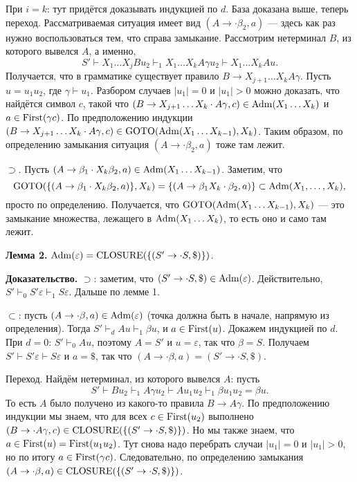 При $i = k$: тут придётся доказывать индукцией по $d$. База доказана выше, теперь переход.
Рассматриваемая ситуация  имеет вид $(A \to \cdot \beta_2, a)$ --- здесь как раз нужно воспользоваться тем, что справа замыкание.
Рассмотрим нетерминал $B$, из которого вывелся $A$, а именно,
\[
    S' \vdash X_1 \dots X_j B u_2 \vdash_1 X_1 \dots X_k A \gamma u_2 \vdash X_1 \dots X_k A u.
\]
Получается, что в грамматике существует правило $B \to X_{j+1} \dots X_k A \gamma$.
Пусть $u = u_1 u_2$, где $\gamma \vdash u_1$.
Разбором случаев $|u_1| = 0$ и $|u_1| > 0$ можно доказать, что найдётся символ $c$, такой что $(B \to X_{j+1} \dots X_k \cdot A \gamma, c) \in \operatorname{Adm}(X_1 \dots X_k)$ и $a \in \operatorname{First}(\gamma c)$.
По предположению индукции $(B \to X_{j+1} \dots X_k \cdot A \gamma, c) \in \operatorname{GOTO}(\operatorname{Adm}(X_1 \dots X_{k-1}), X_k)$.
Таким образом, по определению замыкания ситуация $(A \to \cdot \beta_2, a)$ тоже там лежит.

$\supset$. Пусть $(A \to \beta_1 \cdot X_k \beta_2, a) \in \operatorname{Adm}(X_1 \dots X_{k-1})$.
Заметим, что 
\[
    \operatorname{GOTO}(\{(A \to \beta_1 \cdot X_k \beta_2, a)\}, X_k) = \{(A \to \beta_1 X_k \cdot \beta_2, a)\} \subset \operatorname{Adm}(X_1, \dots, X_k),
\]
просто по определению.
Получается, что $\operatorname{GOTO}(\operatorname{Adm}(X_1 \dots X_{k-1}), X_k)$ --- это замыкание множества, лежащего в $\operatorname{Adm}(X_1 \dots X_k)$, то есть оно и само там лежит.

\QED

\textbf{Лемма 2.} $\operatorname{Adm}(\varepsilon) = \operatorname{CLOSURE}(\{(S' \to \cdot S, \$ )\})$.

\textbf{Доказательство.} $\supset$: заметим, что $(S' \to \cdot S, \$) \in \operatorname{Adm}(\varepsilon)$.
Действительно, $S' \vdash_0 S' \varepsilon \vdash_1 S \varepsilon$.
Дальше по лемме 1.

$\subset$: пусть $(A \to \cdot \beta, a) \in \operatorname{Adm}(\varepsilon)$ (точка должна быть в начале, напрямую из определения).
Тогда $S' \vdash_d Au \vdash_1 \beta u$, и $a \in \operatorname{First}(u)$.
Докажем индукцией по $d$. При $d = 0$: $S' \vdash_0 Au$, поэтому $A = S'$ и $u = \varepsilon$, так что $\beta = S$.
Получаем $S' \vdash S' \varepsilon \vdash S \varepsilon$ и $a = \$$, так что $(A \to \cdot \beta, a) = (S' \to \cdot S, \$)$.

Переход. Найдём нетерминал, из которого вывелся $A$: пусть
\[
    S' \vdash Bu_2 \vdash_1 A \gamma u_2 \vdash A u_1 u_2 \vdash_1 \beta u_1 u_2 = \beta u.
\]
То есть $A$ было получено из какого-то правила $B \to A \gamma$.
По предположению индукции мы знаем, что для всех $c \in \operatorname{First}(u_2)$ выполнено $(B \to \cdot A \gamma, c) \in \operatorname{CLOSURE}(\{(S' \to \cdot S, \$)\})$.
Но мы также знаем, что $a \in \operatorname{First}(u) = \operatorname{First}(u_1 u_2)$.
Тут снова надо перебрать случаи $|u_1| = 0$ и $|u_1| > 0$, но по итогу $a \in \operatorname{First}(\gamma c)$.
Следовательно, по определению замыкания $(A \to \cdot \beta, a) \in \operatorname{CLOSURE}(\{(S' \to \cdot S, \$ )\})$.

